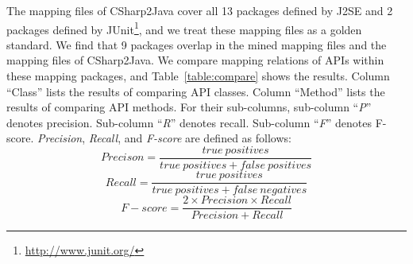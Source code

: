 The mapping files of CSharp2Java cover all 13 packages defined by
J2SE and 2 packages defined by
JUnit\footnote{\url{http://www.junit.org/}}, and we treat these
mapping files as a golden standard. We find that 9 packages overlap
in the mined mapping files and the mapping files of CSharp2Java. We
compare mapping relations of APIs within these mapping packages, and
Table~\ref{table:compare} shows the results. Column ``Class'' lists
the results of comparing API classes. Column ``Method'' lists the
results of comparing API methods. For their sub-columns, sub-column
``\emph{P}'' denotes precision. Sub-column ``\emph{R}'' denotes
recall. Sub-column ``\emph{F}'' denotes F-score. \emph{Precision},
\emph{Recall}, and \emph{F-score} are defined as follows:
\begin{equation}\label{eq-precison}
Precison=\frac{true\ positives}{true\ positives+false\ positives}
\end{equation}
\begin{equation}\label{eq-recall}
Recall=\frac{true\ positives}{true\ positives+false\ negatives}
\end{equation}
\begin{equation}\label{eq-fscore}
F\!-\!score=\frac{2\times Precision \times Recall}{Precision+Recall}
\end{equation}

